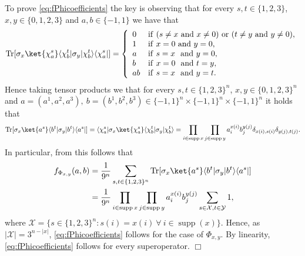 \documentclass[11pt]{article}
\theoremstyle{plain}
\DeclareMathOperator{\Tr}{Tr}
\DeclareMathOperator{\supp}{supp}
\theoremstyle{plain}
\theoremstyle{definition}
\theoremstyle{remark}
\renewenvironment{proof}[1][]{
    \begin{trivlist}
    \item[\hspace{\labelsep}{\em\noindent Proof#1:\/}]}
    {{\hfill$\Box$}
    \end{trivlist}
}
\theoremstyle{named}
\begin{document}
\begin{proof}
    To prove \cref{eq:fPhicoefficients} the key is observing that for every $s,t\in \{1,2,3\}$, $x,y\in \{0,1,2,3\}$ and $a,b\in\{-1,1\}$  we have that
    \begin{equation*}
        \Tr [\sigma_{x}\ket{\chi^{s}_{a}}\langle\chi^{t}_{b}|\sigma_{y}
|\chi^{t}_{b}\rangle\langle\chi^{s}_a|]=\left\{\begin{array}{ll}
           0  & \mathrm{if}\ (s\neq x\ \mathrm{and} \ x\neq 0)\ \mathrm{or}\ (t\neq y\ \mathrm{and} \ y\neq 0),\\
            1  & \mathrm{if}\ x= 0\ \mathrm{and}\ y= 0,\\ 
            a  & \mathrm{if}\ s= x\ \ \mathrm{and}\ y= 0,\\
            b  & \mathrm{if}\ x=0\ \ \mathrm{and}\ t= y,\\
            ab  & \mathrm{if}\ s= x\ \ \mathrm{and}\ y= t.\\
        \end{array}\right.
    \end{equation*}
    Hence taking tensor products we that for every $s,t\in \{1,2,3\}^n$, $x,y\in \{0,1,2,3\}^n$ and $a=(a^1,a^2,a^3),\ b=(b^1,b^2,b^3)\in\{-1,1\}^n\times\{-1,1\}^n\times\{-1,1\}^n$ 
    it holds that 
    \begin{equation*}
        \Tr [\sigma_{x}\ket{a^s}\langle b^t|\sigma_{y}
|b^t\rangle\langle a^s|]=\langle\chi^{s}_a|\sigma_{x}\ket{\chi^{s}_{a}}\langle\chi^{t}_{b}|\sigma_{y}
|\chi^{t}_{b}\rangle=\prod_{i\in\supp x}\prod_{j\in\supp y} a_i^{x(i)}b_j^{y(j)}\delta_{x(i),s(i)}\delta_{y(j),t(j)}.
    \end{equation*}
In particular, from this follows that
\begin{align*}
    f_{\Phi_{x,y}}( a,b)&=\frac{1}{9^n}\sum_{s,t\in \{1,2,3\}^n}\Tr[\sigma_x \ket{a^s}\langle b^{t}|\sigma_y|b^{t}\rangle\langle a^{s}|]
    \\&=\frac{1}{9^n}\prod_{i\in\supp x}\prod_{j\in\supp y} a_i^{x(i)}b_j^{y(j)}\sum_{s\in \mathcal{X},t\in\mathcal{Y}} 1,
\end{align*}
where $\mathcal{X}=\{s\in\{1,2,3\}^n: s(i)=x(i)\ \forall\ i\in\supp (x)\}.$ Hence, as $|\mathcal{X}|=3^{n-|x|}$, \cref{eq:fPhicoefficients} follows for the case of $\Phi_{x,y}$. By linearity, \cref{eq:fPhicoefficients} follows for every superoperator.
\end{proof} 
\end{document}
